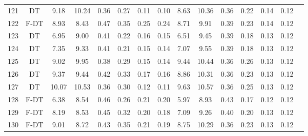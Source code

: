 \begin{longtable}{@{\hskip3pt}c@{\hskip3pt}c@{\hskip3pt}c@{\hskip3pt}c@{\hskip3pt}c@{\hskip3pt}c@{\hskip3pt}c@{\hskip3pt}c@{\hskip3pt}c@{\hskip3pt}c@{\hskip3pt}c@{\hskip3pt}c@{\hskip3pt}c@{\hskip3pt}c@{\hskip3pt}c}
        121 &             DT &              9.18 &       10.24 &          0.36 &        0.27 &        0.11 &         0.10 &                8.63 &       10.36 &          0.36 &        0.22 &        0.14 &         0.12 \\
        122 &           F-DT &              8.93 &        8.43 &          0.47 &        0.35 &        0.25 &         0.24 &                8.71 &        9.91 &          0.39 &        0.23 &        0.14 &         0.12 \\
        123 &             DT &              6.95 &        9.00 &          0.41 &        0.22 &        0.16 &         0.15 &                6.51 &        9.45 &          0.39 &        0.18 &        0.13 &         0.12 \\
        124 &             DT &              7.35 &        9.33 &          0.41 &        0.21 &        0.15 &         0.14 &                7.07 &        9.55 &          0.39 &        0.18 &        0.13 &         0.12 \\
        125 &             DT &              9.02 &        9.95 &          0.38 &        0.29 &        0.15 &         0.14 &                9.44 &       10.44 &          0.36 &        0.26 &        0.13 &         0.12 \\
        126 &             DT &              9.37 &        9.44 &          0.42 &        0.33 &        0.17 &         0.16 &                8.86 &       10.31 &          0.36 &        0.23 &        0.13 &         0.12 \\
        127 &             DT &             10.07 &       10.53 &          0.36 &        0.30 &        0.12 &         0.11 &                9.63 &       10.57 &          0.36 &        0.25 &        0.13 &         0.12 \\
        128 &           F-DT &              6.38 &        8.54 &          0.46 &        0.26 &        0.21 &         0.20 &                5.97 &        8.93 &          0.43 &        0.17 &        0.12 &         0.12 \\
        129 &           F-DT &              8.19 &        8.53 &          0.45 &        0.32 &        0.20 &         0.18 &                7.09 &        9.26 &          0.40 &        0.20 &        0.13 &         0.12 \\
        130 &           F-DT &              9.01 &        8.72 &          0.43 &        0.35 &        0.21 &         0.19 &                8.75 &       10.29 &          0.36 &        0.23 &        0.13 &         0.12 \\

\end{longtable}
